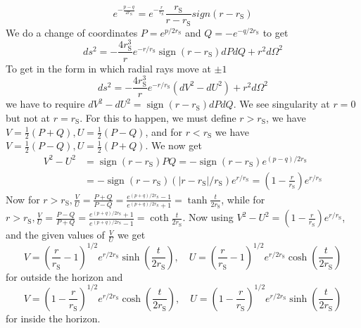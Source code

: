 ﻿\documentclass[12pt,a4paper]{article}
\begin{document}
$$e^{-\frac{p-q}{2r_{\mathrm{S}}}}=e^{-\frac{r}{r_{\mathrm{S}}}} \frac{r_{\mathrm{S}}}{r-r_{\mathrm{S}}}sign(r-r_{\mathrm{S}})$$
We do a change of coordinates $P=e^{p / 2 r_{\mathrm{S}}}$ and $Q=-e^{-q / 2 r_{\mathrm{S}}}$ to get
$$
d s^{2}=-\frac{4 r_{\mathrm{S}}^{3}}{r} e^{-r / r_{\mathrm{S}}} \operatorname{sign}\left(r-r_{\mathrm{S}}\right) d P d Q+r^{2} d \Omega^{2}
$$
To get in the form in which radial rays move at $\pm 1$
$$
d s^{2}=-\frac{4 r_{\mathrm{S}}^{3}}{r} e^{-r / r_{\mathrm{S}}}\left(d V^{2}-d U^{2}\right)+r^{2} d \Omega^{2}
$$
we have to require $d V^{2}-d U^{2}=\operatorname{sign}\left(r-r_{\mathrm{S}}\right) d P d Q$. We see singularity at $r=0$ but not at $r=r_{\mathrm{S}}$. For this to happen, we must define $r>r_{\mathrm{S}}$, we have $V=\frac{1}{2}(P+Q), U=\frac{1}{2}(P-Q)$, and for $r<r_{\mathrm{S}}$ we have $V=\frac{1}{2}(P-Q), U=\frac{1}{2}(P+Q)$. We now get 
$$
\begin{aligned}
V^{2}-U^{2} &=\operatorname{sign}\left(r-r_{\mathrm{S}}\right) P Q=-\operatorname{sign}\left(r-r_{\mathrm{S}}\right) e^{(p-q) / 2 r_{\mathrm{S}}} \\
&=-\operatorname{sign}\left(r-r_{\mathrm{S}}\right)\left(\left|r-r_{\mathrm{S}}\right| / r_{\mathrm{S}}\right) e^{r / r_{\mathrm{S}}}=\left(1-\frac{r}{r_{\mathrm{S}}}\right) e^{r / r_{\mathrm{S}}}
\end{aligned}
$$
Now for $r>r_{\mathrm{S}}, \frac{V}{U}=\frac{P+Q}{P-Q}=\frac{e^{(p+q) / 2 r_{\mathrm{S}}}-1}{e^{(p+q) / 2 r_{\mathrm{S}}}+1}=\tanh \frac{t}{2 r_{\mathrm{S}}}$, while for $r>r_{\mathrm{S}}, \frac{V}{U}=\frac{P-Q}{P+Q}=\frac{e^{(p+q) / 2 r_{\mathrm{S}}}+1}{e^{(p+q) / 2 r_{\mathrm{S}}}-1}=\coth \frac{t}{2 r_{\mathrm{S}}}$. Now using $V^{2}-U^{2}=\left(1-\frac{r}{r_{\mathrm{S}}}\right) e^{r / r_{\mathrm{S}}}$, and the given values of $\frac{V}{U}$ we get 
$$
V=\left(\frac{r}{r_{\mathrm{S}}}-1\right)^{1 / 2} e^{r / 2 r_{\mathrm{S}}} \sinh \left(\frac{t}{2 r_{\mathrm{S}}}\right), \quad U=\left(\frac{r}{r_{\mathrm{S}}}-1\right)^{1 / 2} e^{r / 2 r_{\mathrm{S}}} \cosh \left(\frac{t}{2 r_{\mathrm{S}}}\right)
$$
for outside the horizon and 
$$
V=\left(1-\frac{r}{r_{\mathrm{S}}}\right)^{1 / 2} e^{r / 2 r_{\mathrm{S}}} \cosh \left(\frac{t}{2 r_{\mathrm{S}}}\right), \quad U=\left(1-\frac{r}{r_{\mathrm{S}}}\right)^{1 / 2} e^{r / 2 r_{\mathrm{S}}} \sinh \left(\frac{t}{2 r_{\mathrm{S}}}\right)
$$
for inside the horizon.
\end{document}
